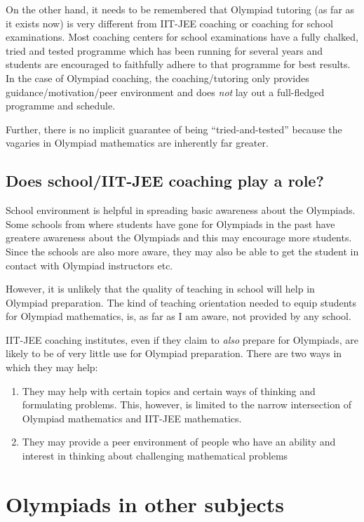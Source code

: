 \documentclass[a4paper]{amsart}
\begin{document}
On the other hand, it needs to be remembered that Olympiad tutoring (as far
as it exists now) is very different from IIT-JEE coaching or coaching 
for school examinations. Most coaching centers for school examinations have
a fully chalked, tried and tested programme which has been running for several
years and students are encouraged to faithfully adhere to that programme
for best results. In the case of Olympiad coaching, the coaching/tutoring
only provides guidance/motivation/peer environment and does {\em not}
lay out a full-fledged programme and schedule.

Further, there is no implicit guarantee of being ``tried-and-tested''
because the vagaries in Olympiad mathematics are inherently far greater.

\subsection{Does school/IIT-JEE coaching play a role?}

School environment is helpful in spreading basic awareness about the
Olympiads. Some schools from where students have gone for Olympiads in
the past have greatere awareness about the Olympiads and this may
encourage more students. Since the schools are also more aware, they
may also be able to get the student in contact with Olympiad
instructors etc.

However, it is unlikely that the quality of teaching in school will
help in Olympiad preparation. The kind of teaching orientation needed
to equip students for Olympiad mathematics, is, as far as I am aware,
not provided by any school.

IIT-JEE coaching institutes, even if they claim to {\em also} prepare
for Olympiads, are likely to be of very little use for Olympiad
preparation.  There are two ways in which they may help: 

\begin{enumerate}
\item They may help with certain topics and certain ways of
  thinking and formulating problems. This, however, is limited to the
  narrow intersection of Olympiad mathematics and IIT-JEE mathematics.

\item They may provide a peer environment of people who have an ability
  and interest in thinking about challenging mathematical problems
\end{enumerate}

\section{Olympiads in other subjects}
\end{document}
